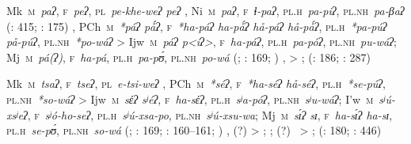 \begin{adjustwidth}{6mm}{0pt}
Mk~\textsc{m}~\textit{paʔ}, \textsc{f}~\textit{peʔ}, \textsc{pl}~\textit{pe\mbox{-}khe\mbox{-}weʔ \recind peʔ} \citep[166]{AG94} {\sep} Ni~\textsc{m}~\textit{paʔ}, \textsc{f}~\textit{ɬ\mbox{-}paʔ}, \textsc{pl.h}~\textit{pa\mbox{-}piʔ}, \textsc{pl.nh}~\textit{pa\mbox{-}βaʔ} (\citealt{AnG15-evid}: 415; \citealt{LC20}: 175) {\sep} PCh~\textsc{m}~\textit{*páʔ \recind *pǻʔ}, \textsc{f}~\textit{*ha\mbox{-}páʔ \recind *ha\mbox{-}pǻʔ \recind *hå\mbox{-}páʔ \recind *hå\mbox{-}pǻʔ}, \textsc{pl.h}~\textit{*pa\mbox{-}púʔ \recind *på\mbox{-}púʔ}, \textsc{pl.nh}~\textit{*po\mbox{-}wáʔ} > Ijw~\textsc{m}~\textit{páʔ \recind p<íʔ>}, \textsc{f}~\textit{ha\mbox{-}páʔ}, \textsc{pl.h}~\textit{pa\mbox{-}póʔ}, \textsc{pl.nh}~\textit{pu\mbox{-}wáʔ}; Mj~\textsc{m}~\textit{pá(ʔ)}, \textsc{f}~\textit{ha\mbox{-}pá}, \textsc{pl.h}~\textit{pa\mbox{-}pʊ́}, \textsc{pl.nh}~\textit{po\mbox{-}wá} (\citealt{JC14a}; \citealt{ND09}: 169; \citealt{JC18}) {\sep}  > ;  (\citealt{VN14}: 186; \citealt{KC16}: 287)


Mk~\textsc{m}~\textit{tsaʔ}, \textsc{f}~\textit{tseʔ}, \textsc{pl}~\textit{e\mbox{-}tsi\mbox{-}weʔ} \citep[166]{AG94} {\sep} PCh~\textsc{m}~\textit{*séʔ}, \textsc{f}~\textit{*ha\mbox{-}séʔ \recind *hå\mbox{-}séʔ}, \textsc{pl.h}~\textit{*se\mbox{-}púʔ}, \textsc{pl.nh}~\textit{*so\mbox{-}wáʔ} > Ijw~\textsc{m}~\textit{sέʔ \recind sʲéʔ}, \textsc{f}~\textit{ha\mbox{-}sέʔ}, \textsc{pl.h}~\textit{sʲa\mbox{-}póʔ}, \textsc{pl.nh}~\textit{sʲu\mbox{-}wáʔ}; I’w~\textsc{m}~\textit{sʲú\mbox{-}xsʲeʔ}, \textsc{f}~\textit{sʲó\mbox{-}ho\mbox{-}seʔ}, \textsc{pl.h}~\textit{sʲú\mbox{-}xsa\mbox{-}po}, \textsc{pl.nh}~\textit{sʲú\mbox{-}xsu\mbox{-}wa}; Mj~\textsc{m}~\textit{sɪ́ʔ \recind sɪ}, \textsc{f}~\textit{ha\mbox{-}sɪ́ʔ \recind ha\mbox{-}sɪ}, \textsc{pl.h}~\textit{se\mbox{-}pʊ́}, \textsc{pl.nh}~\textit{so\mbox{-}wá} (\citealt{JC14a}; \citealt{ND09}: 169; \citealt{AG83}: 160–161; \citealt{JC18}) {\sep} (?)  > ; ; (?)~ > ;  (\citealt{VN14}: 180; \citealt{JAA-KC-14}: 446)



\end{adjustwidth}
